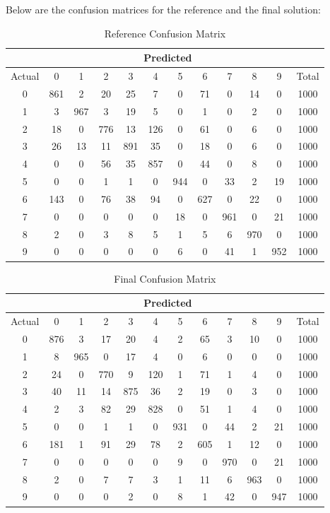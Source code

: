 \documentclass[
  a4paper,            %
  DIV=10,             %
  oneside,            %
  BCOR=5mm,           %
  parskip=half,       %
  numbers=noenddot,   %
  bibtotoc,           %
  listof=totoc,        %
  article
]{scrreprt}
\begin{document}
Below are the confusion matrices for the reference and the final solution:
\begin{table}[h!]
  \centering
  \begin{tabular}{c|*{10}{c}|c}
    & \multicolumn{10}{c|}{Predicted} & \\
  \hline
  Actual & 0 & 1 & 2 & 3 & 4 & 5 & 6 & 7 & 8 & 9 & Total \\
  \hline
  0 & 861 & 2 & 20 & 25 & 7 & 0 & 71 & 0 & 14 & 0 & 1000 \\
  1 & 3 & 967 & 3 & 19 & 5 & 0 & 1 & 0 & 2 & 0 & 1000 \\
  2 & 18 & 0 & 776 & 13 & 126 & 0 & 61 & 0 & 6 & 0 & 1000 \\
  3 & 26 & 13 & 11 & 891 & 35 & 0 & 18 & 0 & 6 & 0 & 1000 \\
  4 & 0 & 0 & 56 & 35 & 857 & 0 & 44 & 0 & 8 & 0 & 1000 \\
  5 & 0 & 0 & 1 & 1 & 0 & 944 & 0 & 33 & 2 & 19 & 1000 \\
  6 & 143 & 0 & 76 & 38 & 94 & 0 & 627 & 0 & 22 & 0 & 1000 \\
  7 & 0 & 0 & 0 & 0 & 0 & 18 & 0 & 961 & 0 & 21 & 1000 \\
  8 & 2 & 0 & 3 & 8 & 5 & 1 & 5 & 6 & 970 & 0 & 1000 \\
  9 & 0 & 0 & 0 & 0 & 0 & 6 & 0 & 41 & 1 & 952 & 1000 \\
  \hline
  \end{tabular}
  \caption*{Reference Confusion Matrix}
  \end{table}
  
  \begin{table}[h!]
  \centering
  \begin{tabular}{c|*{10}{c}|c}
    & \multicolumn{10}{c|}{Predicted} & \\
  \hline
  Actual & 0 & 1 & 2 & 3 & 4 & 5 & 6 & 7 & 8 & 9 & Total \\
  \hline
  0 & 876 & 3 & 17 & 20 & 4 & 2 & 65 & 3 & 10 & 0 & 1000 \\
  1 & 8 & 965 & 0 & 17 & 4 & 0 & 6 & 0 & 0 & 0 & 1000 \\
  2 & 24 & 0 & 770 & 9 & 120 & 1 & 71 & 1 & 4 & 0 & 1000 \\
  3 & 40 & 11 & 14 & 875 & 36 & 2 & 19 & 0 & 3 & 0 & 1000 \\
  4 & 2 & 3 & 82 & 29 & 828 & 0 & 51 & 1 & 4 & 0 & 1000 \\
  5 & 0 & 0 & 1 & 1 & 0 & 931 & 0 & 44 & 2 & 21 & 1000 \\
  6 & 181 & 1 & 91 & 29 & 78 & 2 & 605 & 1 & 12 & 0 & 1000 \\
  7 & 0 & 0 & 0 & 0 & 0 & 9 & 0 & 970 & 0 & 21 & 1000 \\
  8 & 2 & 0 & 7 & 7 & 3 & 1 & 11 & 6 & 963 & 0 & 1000 \\
  9 & 0 & 0 & 0 & 2 & 0 & 8 & 1 & 42 & 0 & 947 & 1000 \\
  \hline
  \end{tabular}
  \caption*{Final Confusion Matrix}
  \end{table}
\end{document}
